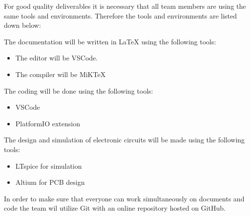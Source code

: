 For good quality deliverables it is necessary that all team members are using the same tools and environments. Therefore the tools and environments are listed down below:

The documentation will be written in LaTeX using the following tools:
\begin{itemize}
    \setlength\itemsep{-0.3em}
    \item The editor will be VSCode.
    \item The compiler will be MiKTeX
\end{itemize}

The coding will be done using the following tools:
\begin{itemize}
    \item VSCode
    \item PlatformIO extension
\end{itemize}

The design and simulation of electronic circuits will be made using the following tools:
\begin{itemize}
    \item LTspice for simulation
    \item Altium for PCB design
\end{itemize}

In order to make sure that everyone can work simultaneously on documents and code the team wil utilize Git with an online repository hosted on GitHub.